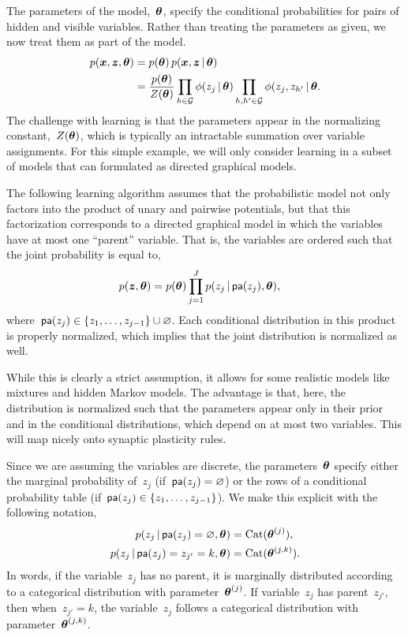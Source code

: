 The parameters of the model,~$\boldsymbol{\theta}$, specify the conditional
probabilities for pairs of hidden and visible variables. Rather than
treating the parameters as given, we now treat them as part of the
model.
\begin{align}
  p(\boldsymbol{x}, \boldsymbol{z}, \boldsymbol{\theta}) &= p(\boldsymbol{\theta}) \, p(\boldsymbol{x}, \boldsymbol{z} \,|\, \boldsymbol{\theta})  \\
  &= \frac{p(\boldsymbol{\theta})}{Z(\boldsymbol{\theta})} \prod_{h \in \mathcal{G}} \phi(z_j \,|\, \boldsymbol{\theta}) \prod_{h,h' \in \mathcal{G}} \phi(z_j, z_{h'} \,|\, \boldsymbol{\theta}.
\end{align}
The challenge with learning is that the parameters appear in the
normalizing constant,~$Z(\boldsymbol{\theta})$, which is typically an intractable
summation over variable assignments. For this simple example,
we will only consider learning in a subset of models that can
formulated as directed graphical models.

\begin{assumption}
  The following learning algorithm assumes that the probabilistic
  model not only factors into the product of unary and pairwise
  potentials, but that this factorization corresponds to a directed
  graphical model in which the variables have at most one ``parent''
  variable. That is, the variables are ordered such that the
  joint probability is equal to,
  \begin{align}
    p(\boldsymbol{z}, \boldsymbol{\theta}) &= p(\boldsymbol{\theta}) \prod_{j=1}^J p(z_j \,|\, \mathsf{pa}(z_j), \boldsymbol{\theta}),
  \end{align}
  where~$\mathsf{pa}(z_j) \in \{z_1, \ldots, z_{j-1}\} \cup \varnothing$.
  Each conditional distribution in this product is properly normalized,
  which implies that the joint distribution is normalized as well.
\end{assumption}

While this is clearly a strict assumption, it allows
for some realistic models like mixtures and hidden Markov models.
The advantage is that, here, the
distribution is normalized such that the parameters appear only
in their prior and in the conditional distributions, which depend
on at most two variables. This will map nicely onto synaptic plasticity
rules. 

Since we are assuming the variables
are discrete, the parameters~$\boldsymbol{\theta}$ specify either the marginal
probability of~$z_j$ (if~$\mathsf{pa}(z_j)=\varnothing$) or the rows of a
conditional probability table (if~$\mathsf{pa}(z_j) \in \{z_1, \ldots, z_{j-1}\}$).
We
make this explicit with the following notation,
\begin{align}
  p(z_j \,|\, \mathsf{pa}(z_j)=\varnothing, \boldsymbol{\theta}) &= \mathrm{Cat}(\boldsymbol{\theta}^{(j)}), \\
  p(z_j \,|\, \mathsf{pa}(z_{j})=z_{j'}=k, \boldsymbol{\theta}) &=  \mathrm{Cat}(\boldsymbol{\theta}^{(j,k)}).
\end{align}
In words, if the variable~$z_j$ has no parent, it is marginally distributed
according to a categorical distribution with parameter~$\boldsymbol{\theta}^{(j)}$.
If variable~$z_j$ has parent~$z_{j'}$, then when~$z_{j'}=k$, the
variable~$z_j$ follows a categorical distribution with
parameter~$\boldsymbol{\theta}^{(j,k)}$. 

